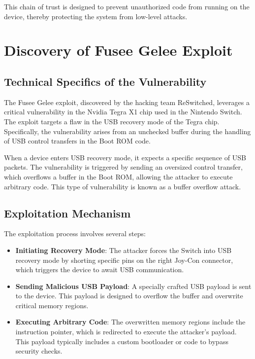 This chain of trust is designed to prevent unauthorized code from running on the device, thereby protecting the system from low-level attacks.

\section{Discovery of Fusee Gelee Exploit}

\subsection{Technical Specifics of the Vulnerability}

The Fusee Gelee exploit, discovered by the hacking team ReSwitched, leverages a critical vulnerability in the Nvidia Tegra X1 chip used in the Nintendo Switch. The exploit targets a flaw in the USB recovery mode of the Tegra chip. Specifically, the vulnerability arises from an unchecked buffer during the handling of USB control transfers in the Boot ROM code.

When a device enters USB recovery mode, it expects a specific sequence of USB packets. The vulnerability is triggered by sending an oversized control transfer, which overflows a buffer in the Boot ROM, allowing the attacker to execute arbitrary code. This type of vulnerability is known as a buffer overflow attack.

\subsection{Exploitation Mechanism}

The exploitation process involves several steps:

\begin{itemize}
    \item \textbf{Initiating Recovery Mode}: The attacker forces the Switch into USB recovery mode by shorting specific pins on the right Joy-Con connector, which triggers the device to await USB communication.
    \item \textbf{Sending Malicious USB Payload}: A specially crafted USB payload is sent to the device. This payload is designed to overflow the buffer and overwrite critical memory regions.
    \item \textbf{Executing Arbitrary Code}: The overwritten memory regions include the instruction pointer, which is redirected to execute the attacker’s payload. This payload typically includes a custom bootloader or code to bypass security checks.
\end{itemize} 


